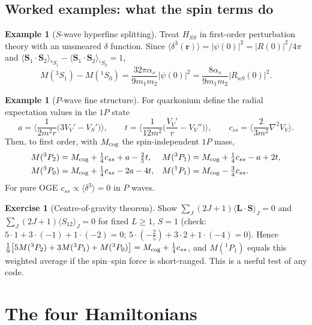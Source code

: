 \documentclass[11pt,a4paper]{article}
\numberwithin{equation}{section}
\theoremstyle{definition}
\newtheorem{example}[definition]{Example}
\newtheorem{exercise}[definition]{Exercise}
\theoremstyle{plain}
\theoremstyle{remark}
\numberwithin{algorithm}{section}
\newcommand{\vr}{\bm r}
\newcommand{\vL}{\bm L}
\newcommand{\vS}{\bm S}
\newcommand{\as}{\alpha_s}
\begin{document}
\subsection{Worked examples: what the spin terms do}\label{sec:examples}
\begin{example}[$S$-wave hyperfine splitting]
Treat $H_{SS}$ in first-order perturbation theory with an unsmeared $\delta$ function. Since $\langle\delta^3(\vr)\rangle=|\psi(0)|^2=|R(0)|^2/4\pi$ and $\langle\vS_1\!\cdot\!\vS_2\rangle_{{}^3S_1}-\langle\vS_1\!\cdot\!\vS_2\rangle_{{}^1S_0}=1$,
\begin{equation}
M({}^3S_1)-M({}^1S_0)=\frac{32\pi\as}{9m_1m_2}|\psi(0)|^2=\frac{8\as}{9m_1m_2}|R_{nS}(0)|^2 .
\end{equation}
\end{example}

\begin{example}[$P$-wave fine structure]
For quarkonium define the radial expectation values in the $1P$ state
\begin{equation}
a=\Big\langle\frac{1}{2m^2r}\big(3V_V'-V_S'\big)\Big\rangle,\qquad t=\Big\langle\frac{1}{12m^2}\Big(\frac{V_V'}{r}-V_V''\Big)\Big\rangle,\qquad
c_{ss}=\Big\langle\frac{2}{3m^2}\nabla^2V_V\Big\rangle .
\end{equation}
Then, to first order, with $M_{\rm cog}$ the spin-independent $1P$ mass,
\begin{align}
M({}^3P_2)&=M_{\rm cog}+\tfrac14c_{ss}+a-\tfrac25t, & M({}^3P_1)&=M_{\rm cog}+\tfrac14c_{ss}-a+2t,\\
M({}^3P_0)&=M_{\rm cog}+\tfrac14c_{ss}-2a-4t, & M({}^1P_1)&=M_{\rm cog}-\tfrac34c_{ss}.
\end{align}
For pure OGE $c_{ss}\propto\langle\delta^3\rangle=0$ in $P$ waves.
\end{example}

\begin{exercise}[Centre-of-gravity theorem]
Show $\sum_J(2J+1)\langle\vL\!\cdot\!\vS\rangle_J=0$ and $\sum_J(2J+1)\langle S_{12}\rangle_J=0$ for fixed $L\geq1$, $S=1$ (check: $5\cdot1+3\cdot(-1)+1\cdot(-2)=0$; $5\cdot(-\frac25)+3\cdot2+1\cdot(-4)=0$). Hence
$\frac19\big[5M({}^3P_2)+3M({}^3P_1)+M({}^3P_0)\big]=M_{\rm cog}+\frac14c_{ss}$, and $M({}^1P_1)$ equals this weighted average if the spin--spin force is short-ranged. This is a useful test of any code.
\end{exercise}
\section{The four Hamiltonians}\label{sec:models}
\end{document}
